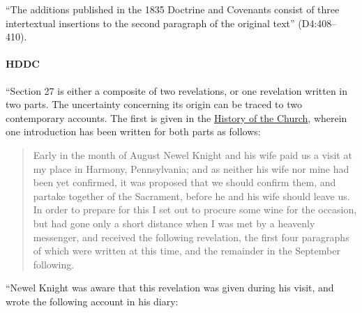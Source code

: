 			``The additions published in the 1835 Doctrine and Covenants consist of three intertextual insertions to the second paragraph of the original text'' (D4:408--410).
			
		\paragraph{HDDC}
		
			``Section 27 is either a composite of two revelations, or one revelation written in two parts. The uncertainty concerning its origin can be traced to two contemporary accounts. The first is given in the \uline{History of the Church}, wherein one introduction has been written for both parts as follows:
			
				\begin{quote}
					Early in the month of August Newel Knight and his wife paid us a visit at my place in Harmony, Pennsylvania; and as neither his wife nor mine had been yet confirmed, it was proposed that we should confirm them, and partake together of the Sacrament, before he and his wife should leave us. In order to prepare for this I set out to procure some wine for the occasion, but had gone only a short distance when I was met by a heavenly messenger, and received the following revelation, the first four paragraphs of which were written at this time, and the remainder in the September following.
				\end{quote}
				
			``Newel Knight was aware that this revelation was given during his visit, and wrote the following account in his diary:
			
